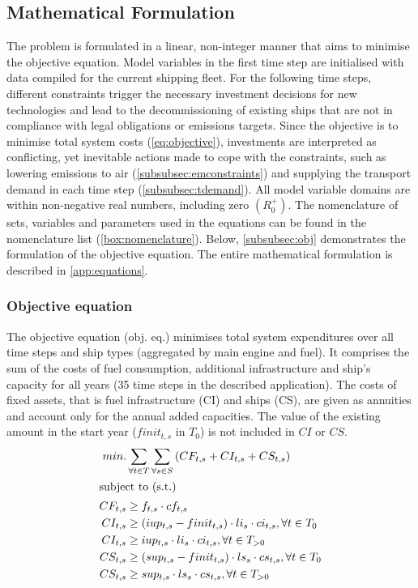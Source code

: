 \documentclass[article]{elsarticle}
\begin{document}
\subsection{Mathematical Formulation}
\label{subsec:Mat}
The problem is formulated in a linear, non-integer manner that aims to minimise the objective equation. Model variables in the first time step are initialised with data compiled for the current shipping fleet. For the following time steps, different constraints trigger the necessary investment decisions for new technologies and lead to the decommissioning of existing ships that are not in compliance with legal obligations or emissions targets. Since the objective is to minimise total system costs  (\autoref{eq:objective}), investments are interpreted as conflicting, yet inevitable actions made to cope with the constraints, such as lowering emissions to air (\ref{subsubsec:emconstraints}) and supplying the transport demand in each time step (\ref{subsubsec:tdemand}). All model variable domains are within non-negative real numbers, including zero $\left(R_{0}^{+}\right)$. The nomenclature of sets, variables and parameters used in the equations can be found in the nomenclature list (\ref{box:nomenclature}). Below, \autoref{subsubsec:obj} demonstrates the formulation of the objective equation. The entire mathematical formulation is described in \ref{app:equations}.

\subsubsection{Objective equation}\label{subsubsec:obj}
The objective equation (obj. eq.) minimises total system expenditures over all time steps and ship types (aggregated by main engine and fuel). It comprises the sum of the costs of fuel consumption, additional infrastructure and ship's capacity for all years (35 time steps in the described application). The costs of fixed assets, that is fuel infrastructure (CI) and ships (CS), are given as annuities and account only for the annual added capacities. The value of the existing amount in the start year ($finit_{t,s}$ in $T_0$) is not included in $CI$ or $CS$.
\begin{subequations}
    \begin{align}
        min. &\sum_{\forall t \in T}\sum_{\forall s \in S}\left( CF_{t, s} + CI_{t, s} + CS_{t, s} \right)\label{eq:objective}\\
        \intertext{subject to (s.t.)}
        CF_{t, s} &\geq f_{t,s} \cdot cf_{t,s}\\
        CI_{t, s} &\geq \left( iup_{t,s} - finit_{t, s} \right) \cdot li_{s} \cdot ci_{t,s}, \forall t \in T_0\\
        CI_{t, s} &\geq iup_{t,s} \cdot li_{s} \cdot ci_{t,s}, \forall t \in T_{>0}\\
        CS_{t, s} &\geq \left( sup_{t,s} - finit_{t, s} \right) \cdot ls_{s} \cdot cs_{t,s}, \forall t \in T_0\\
        CS_{t, s} &\geq sup_{t,s} \cdot ls_{s} \cdot cs_{t,s}, \forall t \in T_{>0}
    \end{align}
\end{subequations}
\end{document}

